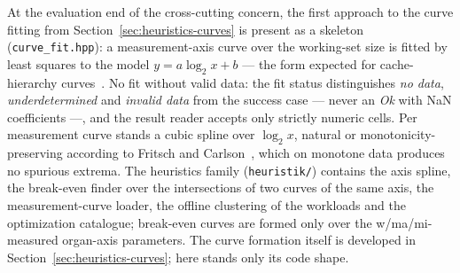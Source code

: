 \begin{nurkurz}
At the evaluation end of the cross-cutting concern, the first approach to the curve fitting from
Section~\ref{sec:heuristics-curves} is present as a skeleton (\texttt{curve\_fit.hpp}): a
measurement-axis curve over the working-set size is fitted by least squares to the model
$y = a\log_2 x + b$ --- the form expected for cache-hierarchy curves~\cite{hill1989associativity}. No
fit without valid data: the fit status distinguishes \emph{no data}, \emph{underdetermined} and
\emph{invalid data} from the success case --- never an \emph{Ok} with NaN coefficients ---, and the
result reader accepts only strictly numeric cells. Per measurement curve stands a cubic spline over
$\log_2 x$, natural or monotonicity-preserving according to Fritsch and
Carlson~\cite{fritsch1980monotone}, which on monotone data produces no spurious extrema. The
heuristics family (\texttt{heuristik/}) contains the axis spline, the break-even finder over the
intersections of two curves of the same axis, the measurement-curve loader, the offline clustering of
the workloads and the optimization catalogue; break-even curves are formed only over the
w/ma/mi-measured organ-axis parameters. The curve formation itself is developed in
Section~\ref{sec:heuristics-curves}; here stands only its code shape.
\end{nurkurz}


